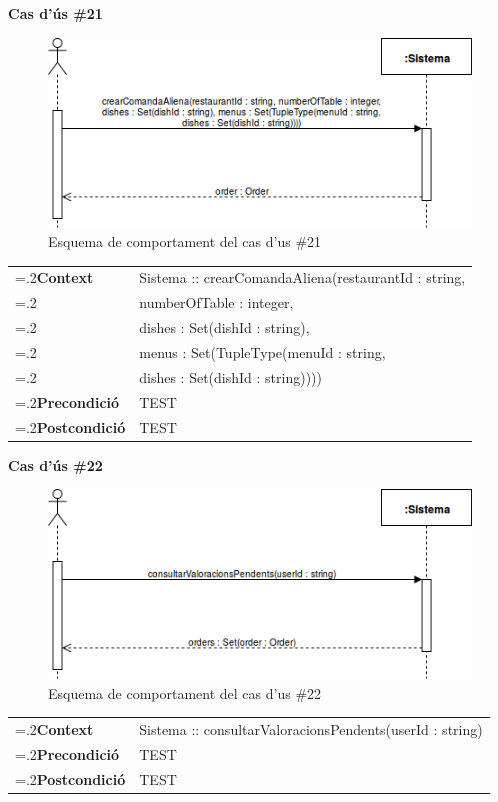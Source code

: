 \clearpage
\noindent\textbf{\large Cas d'ús \#21}\\
\begin{figure}[H]
\centering
\includegraphics[scale=0.6]{Figures/casdus_21.png}
\caption{Esquema de comportament del cas d'us \#21}
\end{figure}
\begin{table}[h]
\noindent
\begin{tabularx}{\linewidth}{
>{\hsize=.2\hsize}X%
>{\hsize=0.8\hsize}X%
}
\textbf{Context} 		& Sistema :: crearComandaAliena(restaurantId : string, \\
						& numberOfTable : integer, \\
						& dishes : Set(dishId : string), \\
						& menus : Set(TupleType(menuId : string, \\
						& dishes : Set(dishId : string)))) \\
\textbf{Precondició} 	& TEST \\
\textbf{Postcondició}	& TEST \\
\end{tabularx}
\label{}
\end{table}

\noindent\textbf{\large Cas d'ús \#22}\\
\begin{figure}[H]
\centering
\includegraphics[scale=0.6]{Figures/casdus_22.png}
\caption{Esquema de comportament del cas d'us \#22}
\end{figure}
\begin{table}[h]
\noindent
\begin{tabularx}{\linewidth}{
>{\hsize=.2\hsize}X%
>{\hsize=0.8\hsize}X%
}
\textbf{Context} 		& Sistema :: consultarValoracionsPendents(userId : string) \\
\textbf{Precondició} 	& TEST \\
\textbf{Postcondició}	& TEST \\
\end{tabularx}
\label{}
\end{table}

